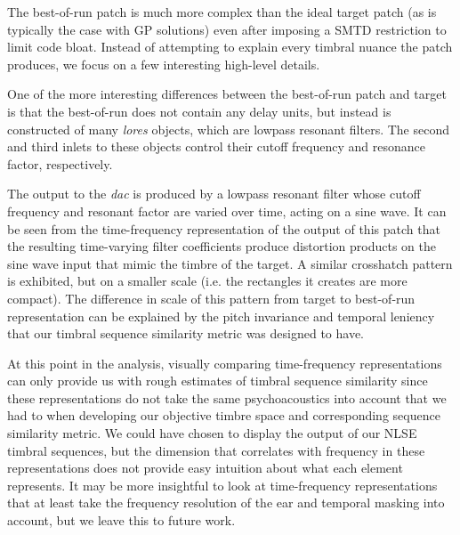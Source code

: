 \documentclass[12pt]{report} 	%
\numberwithin{figure}{chapter}
\numberwithin{table}{chapter}
\numberwithin{equation}{chapter}
\begin{document}
\begin{flushleft}
The best-of-run patch is much more complex than the ideal target patch (as is typically the case with GP solutions) even after imposing a SMTD restriction to limit code bloat. Instead of attempting to explain every timbral nuance the patch produces, we focus on a few interesting high-level details.

One of the more interesting differences between the best-of-run patch and target is that the best-of-run does not contain any delay units, but instead is constructed of many \textit{lores\texttildelow{}} objects, which are lowpass resonant filters. The second and third inlets to these objects control their cutoff frequency and resonance factor, respectively.

The output to the \textit{dac\texttildelow{}} is produced by a lowpass resonant filter whose cutoff frequency and resonant factor are varied over time, acting on a sine wave. It can be seen from the time-frequency representation of the output of this patch that the resulting time-varying filter coefficients produce distortion products on the sine wave input that mimic the timbre of the target. A similar crosshatch pattern is exhibited, but on a smaller scale (i.e. the rectangles it creates are more compact). The difference in scale of this pattern from target to best-of-run representation can be explained by the pitch invariance and temporal leniency that our timbral sequence similarity metric was designed to have.

At this point in the analysis, visually comparing time-frequency representations can only provide us with rough estimates of timbral sequence similarity since these representations do not take the same psychoacoustics into account that we had to when developing our objective timbre space and corresponding sequence similarity metric. We could have chosen to display the output of our NLSE timbral sequences, but the dimension that correlates with frequency in these representations does not provide easy intuition about what each element represents. It may  be more insightful to look at time-frequency representations that at least take the frequency resolution of the ear and temporal masking into account, but we leave this to future work.


\end{flushleft}
\end{document}
